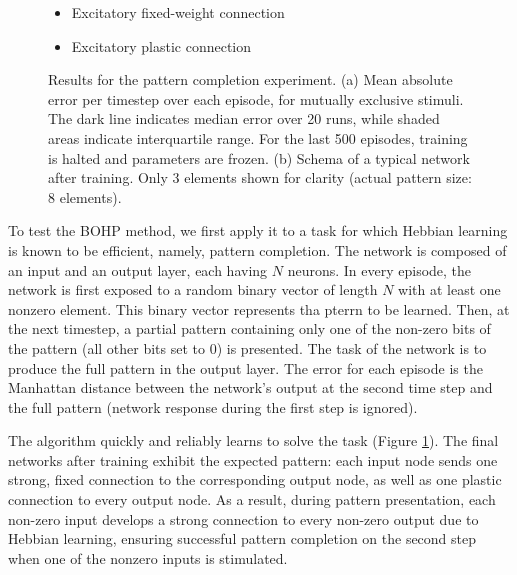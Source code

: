 \documentclass{article}
\begin{document}
\begin{figure}
\begin{subfigure}[t]{0.25\textwidth}
\end{subfigure}
\begin{minipage}[b]{0.25\textwidth}
\centering
\noindent
\begin{itemize}[leftmargin=*] %
\item[]\tikz{\path[very thick,->,draw=black] %
        (0,0) -- (1,0) ;}Excitatory fixed-weight connection
\item[]\tikz{\path[very thick,->,dashed,draw=black] %
        (0,0) -- (1,0) ;}Excitatory plastic connection
\end{itemize}
\end{minipage}
\caption{Results for the pattern completion experiment. (a) Mean absolute error per timestep over each episode, for mutually
exclusive stimuli. The dark line indicates median error
over 20 runs, while shaded areas indicate interquartile range. For the last 500
episodes, training is halted and parameters are frozen. (b) Schema of a
typical network after training. Only 3 elements shown for clarity (actual
pattern size: 8 elements). }
\label{fig:completion}
\end{figure}





To test the BOHP method, we first apply it to a task for which 
Hebbian learning is known to be efficient, namely, pattern completion. The
network is composed of an input and an output layer, each having $N$ neurons.
In every
episode, the network is first exposed to a random binary vector of length $N$
with at least one nonzero element. This binary vector represents tha pterrn to
be learned.
Then, at the next timestep, a partial pattern containing only one of the
non-zero bits of the pattern (all other bits set to 0) is presented. The task of
the network is to produce the full pattern in the output layer. The error for
each episode is the
Manhattan distance between the network's output at the second time step and the
full pattern (network response during the first step is ignored).


The algorithm quickly and reliably learns to solve the task (Figure
\ref{fig:completion}). The final networks
after training exhibit the expected pattern: each input node sends one strong,
fixed connection to the corresponding output node, as well as one plastic
connection to every output node. As a result, during pattern presentation, each
non-zero input develops a strong connection to every non-zero output due to
Hebbian learning, ensuring successful pattern completion on the second step when
one of the nonzero inputs is stimulated. 
\end{document}
